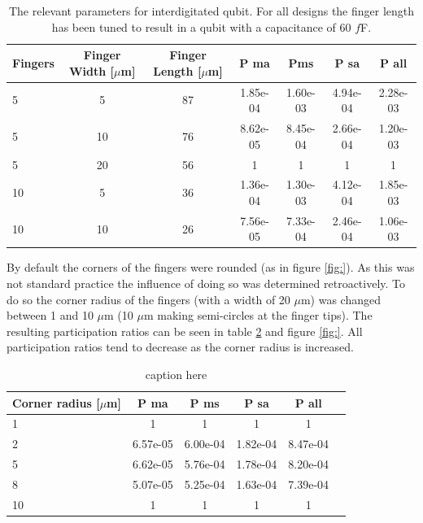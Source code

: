 \begin{table}
	\begin{center}
		\begin{tabular}{ | l || c | c || c | c | c | c |}
			\hline
			Fingers  & Finger Width [\(\mu\)m] & Finger Length [\(\mu\)m]  & P ma &  Pms & P sa & P all \\ \hline
			5 & 5 & 87 & 1.85e-04 & 1.60e-03 & 4.94e-04 & 2.28e-03 \\  
			5 & 10 & 76 & 8.62e-05 & 8.45e-04 & 2.66e-04 & 1.20e-03 \\
			5 & 20 & 56 & 1 & 1 &1  & 1 \\
			10 & 5 & 36 & 1.36e-04 & 1.30e-03 & 4.12e-04 & 1.85e-03 \\
			10 & 10 & 26 & 7.56e-05 & 7.33e-04 & 2.46e-04 & 1.06e-03 \\
			\hline
		\end{tabular}
	\end{center}
	\caption{The relevant parameters for interdigitated qubit. For all designs the finger length has been tuned to result in a qubit with a capacitance of 60 \(f\)F. }
	\label{table:60fF_fingerlength}
\end{table}



By default the corners of the fingers were rounded (as in figure \ref{fig:}). As this was not standard practice the influence of doing so was determined retroactively. To do so the corner radius of the fingers (with a width of 20 \(\mu\)m) was changed between 1 and 10 \(\mu\)m (10 \(\mu\)m making semi-circles at the finger tips). The resulting participation ratios can be seen in table \ref{table:ratio_cornerradius} and figure \ref{fig:}. All participation ratios tend to decrease as the corner radius is increased. 

\begin{table}
	\begin{center}
		\begin{tabular}{ | l || c | c | c | c | c |}
			\hline
			Corner radius [\(\mu\)m] & P ma & P ms & P sa & P all \\ \hline
			1 & 1 & 1 & 1 & 1 \\
			2 & 6.57e-05 & 6.00e-04 & 1.82e-04 & 8.47e-04 \\
			5 & 6.62e-05 & 5.76e-04 & 1.78e-04 & 8.20e-04\\
			8 & 5.07e-05 & 5.25e-04 & 1.63e-04 & 7.39e-04\\
			10 & 1 & 1 & 1 & 1\\
			\hline
		\end{tabular}
	\end{center}
	\caption{caption here}
	\label{table:ratio_cornerradius}
\end{table}

